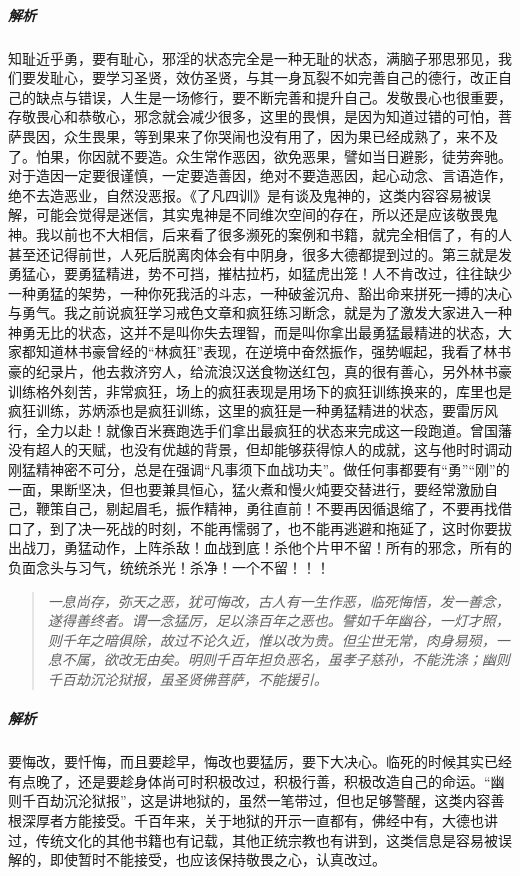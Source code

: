 \subparagraph{解析} 知耻近乎勇，要有耻心，邪淫的状态完全是一种无耻的状态，满脑子邪思邪见，我们要发耻心，要学习圣贤，效仿圣贤，与其一身瓦裂不如完善自己的德行，改正自己的缺点与错误，人生是一场修行，要不断完善和提升自己。发敬畏心也很重要，存敬畏心和恭敬心，邪念就会减少很多，这里的畏惧，是因为知道过错的可怕，菩萨畏因，众生畏果，等到果来了你哭闹也没有用了，因为果已经成熟了，来不及了。怕果，你因就不要造。众生常作恶因，欲免恶果，譬如当日避影，徒劳奔驰。对于造因一定要很谨慎，一定要造善因，绝对不要造恶因，起心动念、言语造作，绝不去造恶业，自然没恶报。《了凡四训》是有谈及鬼神的，这类内容容易被误解，可能会觉得是迷信，其实鬼神是不同维次空间的存在，所以还是应该敬畏鬼神。我以前也不大相信，后来看了很多濒死的案例和书籍，就完全相信了，有的人甚至还记得前世，人死后脱离肉体会有中阴身，很多大德都提到过的。第三就是发勇猛心，要勇猛精进，势不可挡，摧枯拉朽，如猛虎出笼！人不肯改过，往往缺少一种勇猛的架势，一种你死我活的斗志，一种破釜沉舟、豁出命来拼死一搏的决心与勇气。我之前说疯狂学习戒色文章和疯狂练习断念，就是为了激发大家进入一种神勇无比的状态，这并不是叫你失去理智，而是叫你拿出最勇猛最精进的状态，大家都知道林书豪曾经的“林疯狂”表现，在逆境中奋然振作，强势崛起，我看了林书豪的纪录片，他去救济穷人，给流浪汉送食物送红包，真的很有善心，另外林书豪训练格外刻苦，非常疯狂，场上的疯狂表现是用场下的疯狂训练换来的，库里也是疯狂训练，苏炳添也是疯狂训练，这里的疯狂是一种勇猛精进的状态，要雷厉风行，全力以赴！就像百米赛跑选手们拿出最疯狂的状态来完成这一段跑道。曾国藩没有超人的天赋，也没有优越的背景，但却能够获得惊人的成就，这与他时时调动刚猛精神密不可分，总是在强调“凡事须下血战功夫”。做任何事都要有“勇”“刚”的一面，果断坚决，但也要兼具恒心，猛火煮和慢火炖要交替进行，要经常激励自己，鞭策自己，剔起眉毛，振作精神，勇往直前！不要再因循退缩了，不要再找借口了，到了决一死战的时刻，不能再懦弱了，也不能再逃避和拖延了，这时你要拔出战刀，勇猛动作，上阵杀敌！血战到底！杀他个片甲不留！所有的邪念，所有的负面念头与习气，统统杀光！杀净！一个不留！！！

\begin{quote}\it
    一息尚存，弥天之恶，犹可悔改，古人有一生作恶，临死悔悟，发一善念，遂得善终者。谓一念猛厉，足以涤百年之恶也。譬如千年幽谷，一灯才照，则千年之暗俱除，故过不论久近，惟以改为贵。但尘世无常，肉身易殒，一息不属，欲改无由矣。明则千百年担负恶名，虽孝子慈孙，不能洗涤；幽则千百劫沉沦狱报，虽圣贤佛菩萨，不能援引。
\end{quote}

\subparagraph{解析} 要悔改，要忏悔，而且要趁早，悔改也要猛厉，要下大决心。临死的时候其实已经有点晚了，还是要趁身体尚可时积极改过，积极行善，积极改造自己的命运。“幽则千百劫沉沦狱报”，这是讲地狱的，虽然一笔带过，但也足够警醒，这类内容善根深厚者方能接受。千百年来，关于地狱的开示一直都有，佛经中有，大德也讲过，传统文化的其他书籍也有记载，其他正统宗教也有讲到，这类信息是容易被误解的，即使暂时不能接受，也应该保持敬畏之心，认真改过。

